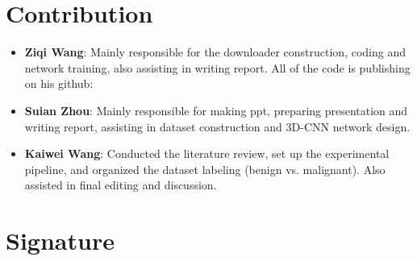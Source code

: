 \documentclass{article}
\begin{document}
\section{Contribution}
\begin{itemize}
\item \textbf{Ziqi Wang}: Mainly responsible for the downloader construction, coding and network training, also assisting in writing report. All of the code is publishing on his github:
\item \textbf{Suian Zhou}: Mainly responsible for making ppt, preparing presentation and writing report, assisting in dataset construction and 3D-CNN network design.
\item \textbf{Kaiwei Wang}: Conducted the literature review, set up the experimental pipeline, and organized the dataset labeling (benign vs. malignant). Also assisted in final editing and discussion.
\end{itemize}

\section{Signature}



\end{document}
